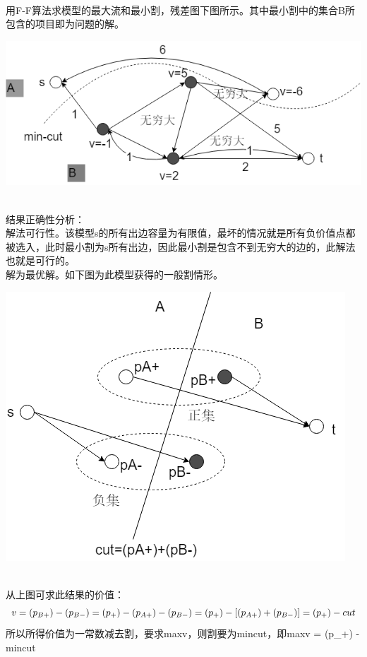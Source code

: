 \\用F-F算法求模型的最大流和最小割，残差图下图所示。其中最小割中的集合B所包含的项目即为问题的解。\\
\centerline{\includegraphics[scale=0.6]{Ln11.image/networkflow10.png}}
\\结果正确性分析：
\\解法可行性。该模型s的所有出边容量为有限值，最坏的情况就是所有负价值点都被选入，此时最小割为s所有出边，因此最小割是包含不到无穷大的边的，此解法也就是可行的。\\
解为最优解。如下图为此模型获得的一般割情形。\\
\centerline{\includegraphics[scale=0.6]{Ln11.image/networkflow11.png}}
\\从上图可求此结果的价值：\\
\begin{equation}
v = (p_{B+}) - (p_{B-}) = (p_+) - (p_{A+}) - (p_{B-}) = (p_+) - [(p_{A+}) + (p_{B-})] = (p_+) - cut\\
\end{equation}
所以所得价值为一常数减去割，要求maxv，则割要为mincut，即maxv = (p_+) -mincut


